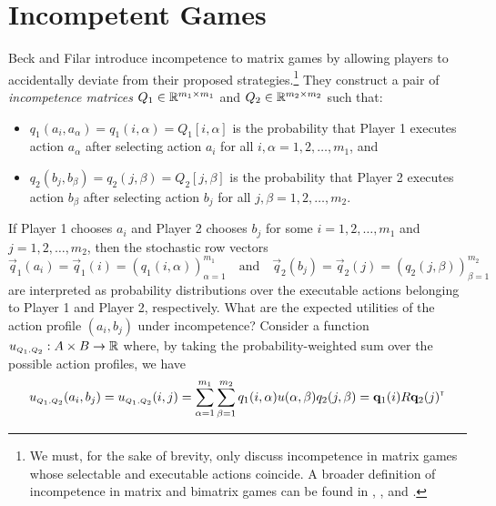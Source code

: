 \section{Incompetent Games}
\label{sec:incompetent-games}
    Beck and Filar \parencite{Beck2007} introduce incompetence to matrix games by allowing players to accidentally deviate from their proposed strategies.\footnote{We
        must, for the sake of brevity, only discuss incompetence in matrix games whose selectable and executable actions coincide.
        A broader definition of incompetence in matrix and bimatrix games can be found in \parencite{Beck2013}, \parencite{Beck2012}, and \parencite{Beck2007}.
    }
    They construct a pair of \emph{incompetence matrices} $Q_1 \in \mathbb{R}^{m_1 \times m_1}$ and $Q_2 \in \mathbb{R}^{m_2 \times m_2}$ such that:
    \begin{itemize}
        \item $q_1(a_i, a_\alpha) = q_1(i, \alpha) = Q_1[i, \alpha]$ is the probability that Player 1 executes action $a_\alpha$ after selecting action $a_i$ for all $i, \alpha = 1, 2, \ldots, m_1$, and
        \item $q_2(b_j, b_\beta) = q_2(j, \beta) = Q_2[j, \beta]$ is the probability that Player 2 executes action $b_\beta$ after selecting action $b_j$ for all $j, \beta = 1, 2, \ldots, m_2$.
    \end{itemize}
    If Player 1 chooses $a_i$ and Player 2 chooses $b_j$ for some $i = 1, 2, \ldots, m_1$ and $j = 1, 2, \ldots, m_2$, then the stochastic row vectors
    \[
        \vec{q}_1(a_i)
            = \vec{q}_1(i)
            = (q_1(i, \alpha))_{\alpha = 1}^{m_1}
        \quad\text{and}\quad
            \vec{q}_2(b_j)
            = \vec{q}_2(j)
            = (q_2(j, \beta))_{\beta = 1}^{m_2}
    \]
    are interpreted as probability distributions over the executable actions belonging to Player 1 and Player 2, respectively.
    What are the expected utilities of the action profile $(a_i, b_j)$ under incompetence?
    Consider a function $u_\ms{Q_1, Q_2} : A \times B \to \RR$ where, by taking the probability-weighted sum over the possible action profiles, we have
    \begin{equation} \label{eq:incompetent-utility}
        u_\ms{Q_1, Q_2}(a_i, b_j)
            = u_\ms{Q_1, Q_2}(i, j)
            = \sum_{\alpha = 1}^{m_1} \sum_{\beta = 1}^{m_2} q_1(i, \alpha) u(\alpha, \beta) q_2(j, \beta)
            = \vec{q}_1(i) R \vec{q}_2(j)^\transp
    \end{equation}
